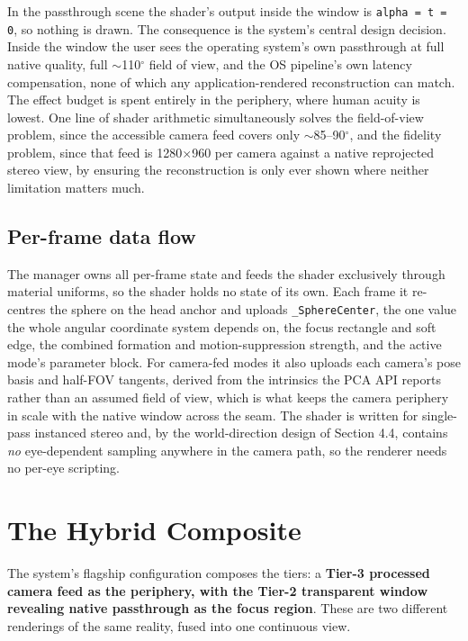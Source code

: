 In the passthrough scene the shader's output inside the window is \verb|alpha = t = 0|, so nothing is
drawn. The consequence is the system's central design decision. Inside the window the user sees the
operating system's own passthrough at full native quality, full $\sim$110$^{\circ}$ field of view,
and the OS pipeline's own latency compensation, none of which any application-rendered reconstruction
can match. The effect budget is spent entirely in the periphery, where human acuity is lowest. One
line of shader arithmetic simultaneously solves the field-of-view problem, since the accessible
camera feed covers only $\sim$85–90$^{\circ}$, and the fidelity problem, since that feed is
1280$\times$960 per camera against a native reprojected stereo view, by ensuring the reconstruction is only ever shown
where neither limitation matters much.

\subsection{Per-frame data flow}

The manager owns all per-frame state and feeds the shader exclusively through material uniforms, so
the shader holds no state of its own. Each frame it re-centres the sphere on the head anchor and
uploads \verb|_SphereCenter|, the one value the whole angular coordinate system depends on, the focus
rectangle and soft edge, the combined formation and motion-suppression strength, and the active
mode's parameter block. For camera-fed modes it also uploads each camera's pose basis and half-FOV
tangents, derived from the intrinsics the PCA API reports rather than an assumed field of view, which
is what keeps the camera periphery in scale with the native window across the seam. The shader is
written for single-pass instanced stereo and, by the world-direction design of Section 4.4, contains
\textit{no} eye-dependent sampling anywhere in the camera path, so the renderer needs no per-eye
scripting.

\section{The Hybrid Composite}

The system's flagship configuration composes the tiers: a \textbf{Tier-3 processed camera feed as the
periphery, with the Tier-2 transparent window revealing native passthrough as the focus region}.
These are two different renderings of the same reality, fused into one continuous view.

